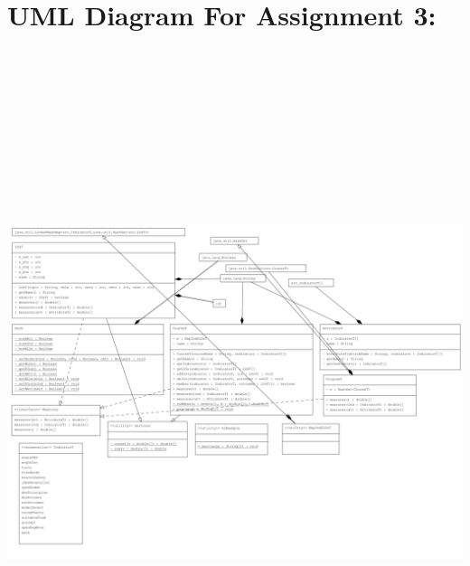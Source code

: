 \documentclass[12pt]{article}
\begin{document}
\newpage
\graphicspath{{C:/Users/hp/OneDrive/Desktop}}
\section*{UML Diagram For Assignment 3:}
\begin{center}
\includegraphics[width=20cm, height=20cm]{UML.png}
\end{center}{}
\end{document}
